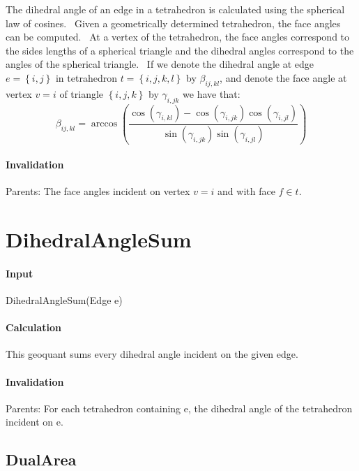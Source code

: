 The dihedral angle of an edge in a tetrahedron is calculated using the
spherical law of cosines. \ Given a geometrically determined tetrahedron,
the face angles can be computed. \ At a vertex of the tetrahedron, the face
angles correspond to the sides lengths of a spherical triangle and the
dihedral angles correspond to the angles of the spherical triangle. \ If we
denote the dihedral angle at edge $e=\left\{ i,j\right\} $ in tetrahedron $%
t=\left\{ i,j,k,l\right\} $ by $\beta _{ij,kl}$, and denote the face angle
at vertex $v=i$ of triangle $\left\{ i,j,k\right\} $ by $\gamma _{i,jk}$ we
have that:%
\begin{equation*}
\beta _{ij,kl}=\arccos \left( \frac{\cos \left( \gamma _{i,kl}\right) -\cos
\left( \gamma _{i,jk}\right) \cos \left( \gamma _{i,jl}\right) }{\sin \left(
\gamma _{i,jk}\right) \sin \left( \gamma _{i,jl}\right) }\right)
\end{equation*}

\paragraph{Invalidation}

\bigskip Parents: The face angles incident on vertex $v=i$ and with face $%
f\in t$.

\section{DihedralAngleSum}

\paragraph{Input}

DihedralAngleSum(Edge e)

\paragraph{Calculation}

This geoquant sums every dihedral angle incident on the given edge.

\paragraph{Invalidation}

\bigskip Parents: For each tetrahedron containing e, the dihedral angle of
the tetrahedron incident on e.

\subsection{DualArea}

